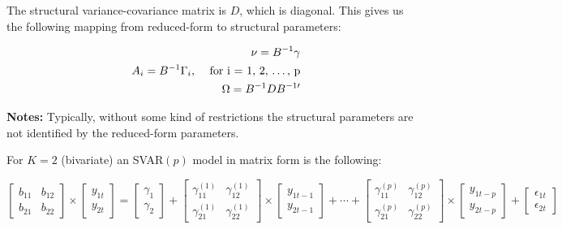 \documentclass[11pt]{article}
\begin{document}
The structural variance-covariance matrix is $D$, which is diagonal. This gives us the following mapping
from reduced-form to structural parameters:

\vspace{2mm}
\begin{eqnarray*}
&& \nu = B^{-1} \gamma \\
&& A_{i} = B^{-1} \Gamma_{i} \mbox{, \quad for i = 1, 2, \ldots, p} \\
&& \Omega = B^{-1} D B^{-1 \prime}
\end{eqnarray*}

\vspace{3.5mm}
\textbf{Notes:} Typically, without some kind of restrictions the structural parameters are not identified
by the reduced-form parameters.

\vspace{3.5mm}
For $K=2$ (bivariate) an SVAR$(p)$ model in matrix form is the following:

\vspace{3mm}
\begin{equation*}
\begin{bmatrix} b_{11} & b_{12} \\ b_{21} & b_{22} \end{bmatrix} \times 
\left[ \begin{array}{c} y_{1t} \\ y_{2t} \end{array} \right] = \left[\begin{array}{c} \gamma_{1} \\ \gamma_{2} \end{array}\right]
+ \begin{bmatrix} \gamma_{11}^{(1)} & \gamma_{12}^{(1)} \\ \gamma_{21}^{(1)} & \gamma_{22}^{(1)} \end{bmatrix} \times 
\left[\begin{array}{c} y_{1t-1} \\ y_{2t-1} \end{array} \right] + 
\cdots + 
\begin{bmatrix} \gamma_{11}^{(p)} & \gamma_{12}^{(p)} \\ \gamma_{21}^{(p)} & \gamma_{22}^{(p)} \end{bmatrix} \times
\left[\begin{array}{c} y_{1t-p} \\ y_{2t-p} \end{array} \right] +  
\left[\begin{array}{c} \epsilon_{1t} \\ \epsilon_{2t} \end{array} \right]
\end{equation*}
\end{document}
